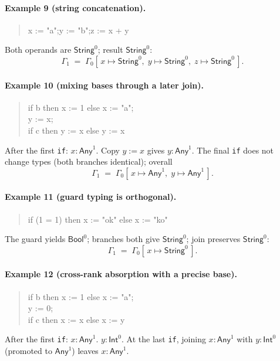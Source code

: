 \paragraph{Example 9 (string concatenation).}
\begin{quote}\ttfamily
x := "a";\quad y := "b";\quad z := x + y
\end{quote}
Both operands are $\textsf{String}^{0}$; result $\textsf{String}^{0}$:
\[
\Gamma_1 \;=\; \Gamma_0[\,x \mapsto \textsf{String}^{0},\;
                       y \mapsto \textsf{String}^{0},\;
                       z \mapsto \textsf{String}^{0}\,].
\]

\paragraph{Example 10 (mixing bases through a later join).}
\begin{quote}\ttfamily
if b then x := 1 else x := "a";\\
y := x;\\
if c then y := x else y := x
\end{quote}
After the first \texttt{if}: $x:\textsf{Any}^{1}$.  
Copy $y:=x$ gives $y:\textsf{Any}^{1}$.  
The final \texttt{if} does not change types (both branches identical);
overall
\[
\Gamma_1 \;=\; \Gamma_0[\,x \mapsto \textsf{Any}^{1},\; y \mapsto \textsf{Any}^{1}\,].
\]

\paragraph{Example 11 (guard typing is orthogonal).}
\begin{quote}\ttfamily
if (1 = 1) then x := "ok" else x := "ko"
\end{quote}
The guard yields $\textsf{Bool}^{0}$; branches both give $\textsf{String}^{0}$; join preserves $\textsf{String}^{0}$:
\[
\Gamma_1 \;=\; \Gamma_0[\,x \mapsto \textsf{String}^{0}\,].
\]

\paragraph{Example 12 (cross-rank absorption with a precise base).}
\begin{quote}\ttfamily
if b then x := 1 else x := "a";\\
y := 0;\\
if c then x := x else x := y
\end{quote}
After the first \texttt{if}: $x:\textsf{Any}^{1}$.  
$y:\textsf{Int}^{0}$.  
At the last \texttt{if}, joining $x:\textsf{Any}^{1}$ with $y:\textsf{Int}^{0}$ (promoted to $\textsf{Any}^{1}$) leaves $x:\textsf{Any}^{1}$.

